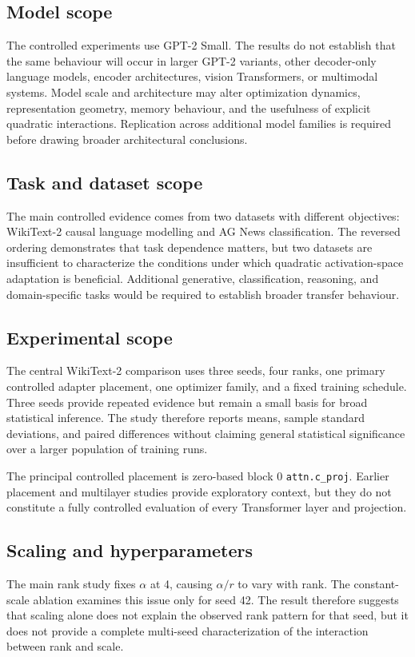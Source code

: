 \documentclass[11pt]{article}
\begin{document}
\subsection{Model scope}
The controlled experiments use GPT-2 Small. The results do not establish that the same behaviour will occur in larger GPT-2 variants, other decoder-only language models, encoder architectures, vision Transformers, or multimodal systems. Model scale and architecture may alter optimization dynamics, representation geometry, memory behaviour, and the usefulness of explicit quadratic interactions. Replication across additional model families is required before drawing broader architectural conclusions.

\subsection{Task and dataset scope}
The main controlled evidence comes from two datasets with different objectives: WikiText-2 causal language modelling and AG News classification. The reversed ordering demonstrates that task dependence matters, but two datasets are insufficient to characterize the conditions under which quadratic activation-space adaptation is beneficial. Additional generative, classification, reasoning, and domain-specific tasks would be required to establish broader transfer behaviour.

\subsection{Experimental scope}
The central WikiText-2 comparison uses three seeds, four ranks, one primary controlled adapter placement, one optimizer family, and a fixed training schedule. Three seeds provide repeated evidence but remain a small basis for broad statistical inference. The study therefore reports means, sample standard deviations, and paired differences without claiming general statistical significance over a larger population of training runs.

The principal controlled placement is zero-based block 0 \texttt{attn.c\_proj}. Earlier placement and multilayer studies provide exploratory context, but they do not constitute a fully controlled evaluation of every Transformer layer and projection.

\subsection{Scaling and hyperparameters}
The main rank study fixes $\alpha$ at 4, causing $\alpha/r$ to vary with rank. The constant-scale ablation examines this issue only for seed 42. The result therefore suggests that scaling alone does not explain the observed rank pattern for that seed, but it does not provide a complete multi-seed characterization of the interaction between rank and scale.
\end{document}
